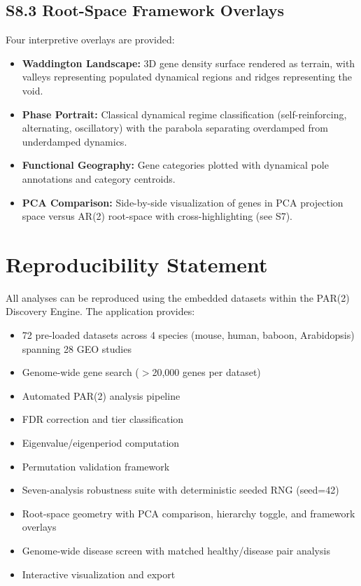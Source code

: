 \documentclass[11pt,a4paper]{article}
\begin{document}
\subsection{S8.3 Root-Space Framework Overlays}

Four interpretive overlays are provided:
\begin{itemize}
    \item \textbf{Waddington Landscape:} 3D gene density surface rendered as terrain, with valleys representing populated dynamical regions and ridges representing the void.
    \item \textbf{Phase Portrait:} Classical dynamical regime classification (self-reinforcing, alternating, oscillatory) with the parabola separating overdamped from underdamped dynamics.
    \item \textbf{Functional Geography:} Gene categories plotted with dynamical pole annotations and category centroids.
    \item \textbf{PCA Comparison:} Side-by-side visualization of genes in PCA projection space versus AR(2) root-space with cross-highlighting (see S7).
\end{itemize}

\section{Reproducibility Statement}

All analyses can be reproduced using the embedded datasets within the PAR(2) Discovery Engine. The application provides:

\begin{itemize}
    \item 72 pre-loaded datasets across 4 species (mouse, human, baboon, Arabidopsis) spanning 28 GEO studies
    \item Genome-wide gene search ($>$20,000 genes per dataset)
    \item Automated PAR(2) analysis pipeline
    \item FDR correction and tier classification
    \item Eigenvalue/eigenperiod computation
    \item Permutation validation framework
    \item Seven-analysis robustness suite with deterministic seeded RNG (seed=42)
    \item Root-space geometry with PCA comparison, hierarchy toggle, and framework overlays
    \item Genome-wide disease screen with matched healthy/disease pair analysis
    \item Interactive visualization and export
\end{itemize}
\end{document}
